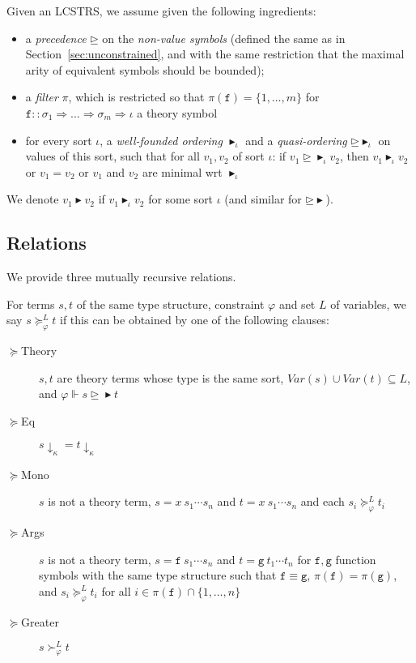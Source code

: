 \documentclass[a4paper,USenglish,cleveref,autoref,thm-restate]{lipics-v2021}
\newcommand{\Var}{\mathit{Var}}
\newcommand{\gtvA}{L}
\newcommand{\downarrowcalc}{\downarrow_\kappa}
\newcommand{\arrtype}{\Rightarrow}
\newcommand{\geqth}{\succeq_\varphi^\gtvA}
\newcommand{\grth}{\succ_\varphi^\gtvA}
\newcommand{\geqpred}{\unrhd}
\newcommand{\eqpred}{\equiv}
\newcommand{\grsort}{\blacktriangleright}
\newcommand{\geqsort}{\unrhd\!\!\!\!\!\!\blacktriangleright}
\newcommand{\symb}[1]{\mathtt{#1}}
\newcommand{\afun}{\symb{f}}
\newcommand{\bfun}{\symb{g}}
\newcommand{\atype}{\sigma}
\newcommand{\asort}{\iota}
\newcommand{\avar}{x}
\newcommand{\filter}{\pi}
\begin{document}
Given an LCSTRS, we assume given the following ingredients:
\begin{itemize}
\item a \emph{precedence} $\geqpred$ on the \emph{non-value symbols} (defined the same as in
  Section~\ref{sec:unconstrained}, and with the same restriction that the maximal arity of
  equivalent symbols should be bounded);
\item a \emph{filter} $\filter$, which is restricted so that $\filter(\afun) = \{1,\dots,m\}$ for
  $\afun :: \atype_1 \arrtype \dots \arrtype \atype_m \arrtype \asort$ a theory symbol
\item for every sort $\asort$, a \emph{well-founded ordering} $\grsort_{\asort}$ and a
  \emph{quasi-ordering} $\geqsort_{\asort}$ on values of this sort, such that for all $v_1,v_2$ of
  sort $\asort$: if $v_1 \geqsort_\asort v_2$, then $v_1 \grsort_\asort v_2$ or $v_1 = v_2$ or
  $v_1$ and $v_2$ are minimal wrt $\grsort_{\asort}$
\end{itemize}
We denote $v_1 \grsort v_2$ if $v_1 \grsort_\asort v_2$ for some sort $\asort$ (and similar for
$\geqsort$).

\subsection{Relations}

We provide three mutually recursive relations.

For terms $s,t$ of the same type structure, constraint $\varphi$ and set $\gtvA$ of variables, we
say $s \geqth t$ if this can be obtained by one of the following clauses:
\begin{description}
\item[$\succeq$Theory] $s,t$ are theory terms whose type is the same sort,
  $\Var(s) \cup \Var(t) \subseteq \gtvA$,
  and $\varphi \Vdash s \geqsort t$
\item[$\succeq$Eq] $s\downarrowcalc = t\downarrowcalc$
\item[$\succeq$Mono] $s$ is not a theory term,
  $s = \avar\ s_1 \cdots s_n$ and $t = \avar\ s_1 \cdots s_n$ and each $s_i \geqth t_i$
\item[$\succeq$Args] $s$ is not a theory term,
  $s = \afun\ s_1 \cdots s_n$ and $t = \bfun\ t_1 \cdots t_n$ for $\afun,\bfun$
  function symbols with the same type structure such that $\afun \eqpred \bfun$,
  $\filter(\afun) = \filter(\bfun)$, and $s_i \geqth t_i$ for all $i \in \filter(\afun) \cap
  \{1,\dots,n\}$
\item[$\succeq$Greater] $s \grth t$
\end{description}
\end{document}
